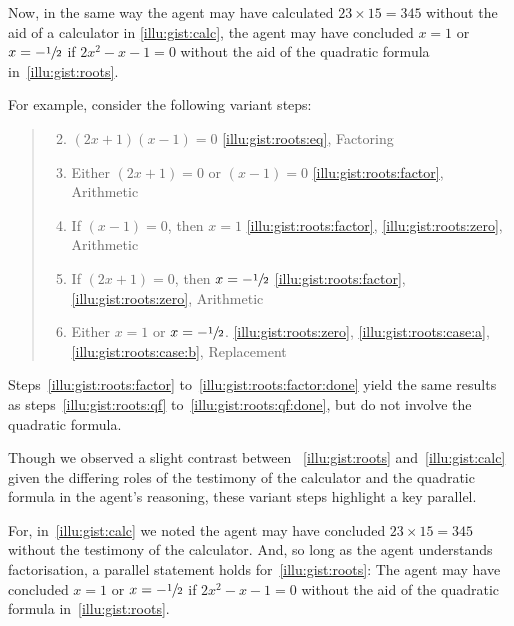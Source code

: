 \begin{note}
  Now, in the same way the agent may have calculated \(23 \times 15 = 345\) without the aid of a calculator in \autoref{illu:gist:calc}, the agent may have concluded \(x = 1\) or \(x = -\sfrac{1}{2}\) if \(2x^{2} - x - 1 = 0\) without the aid of the quadratic formula in~\autoref{illu:gist:roots}.

  For example, consider the following variant steps:
  \begin{quote}
    \begin{enumerate}[label=\arabic*\('\)., ref=(\arabic*\('\)), itemsep=.125em]
      \setcounter{enumi}{1}
    \item
      \label{illu:gist:roots:factor}
      \((2x + 1)(x - 1) = 0\) \hfill \ref{illu:gist:roots:eq}, Factoring
    \item
      \label{illu:gist:roots:zero}
      Either \((2x + 1) = 0\) or \((x - 1) = 0\) \hfill \ref{illu:gist:roots:factor}, Arithmetic
    \item
      \label{illu:gist:roots:case:a}
      If \((x - 1) = 0\), then \(x = 1\) \hfill \ref{illu:gist:roots:factor}, \ref{illu:gist:roots:zero}, Arithmetic
    \item
      \label{illu:gist:roots:case:b}
      If \((2x + 1) = 0\), then \(x = -\sfrac{1}{2}\) \hfill \ref{illu:gist:roots:factor}, \ref{illu:gist:roots:zero}, Arithmetic
    \item
      \label{illu:gist:roots:factor:done}
      Either \(x = 1\) or \(x = -\sfrac{1}{2}\). \hfill \ref{illu:gist:roots:zero}, \ref{illu:gist:roots:case:a}, \ref{illu:gist:roots:case:b}, Replacement
    \end{enumerate}
  \end{quote}

  Steps~\ref{illu:gist:roots:factor} to~\ref{illu:gist:roots:factor:done} yield the same results as steps~\ref{illu:gist:roots:qf} to~\ref{illu:gist:roots:qf:done}, but do not involve the quadratic formula.
\end{note}

\begin{note}
  Though we observed a slight contrast between ~\ref{illu:gist:roots} and~\ref{illu:gist:calc} given the differing roles of the testimony of the calculator and the quadratic formula in the agent's reasoning, these variant steps highlight a key parallel.

  For, in~\autoref{illu:gist:calc} we noted the agent may have concluded \(23 \times 15 = 345\) without the testimony of the calculator.
  And, so long as the agent understands factorisation, a parallel statement holds for~\ref{illu:gist:roots}:
  The agent may have concluded \(x = 1\) or \(x = -\sfrac{1}{2}\) if \(2x^{2} - x - 1 = 0\) without the aid of the quadratic formula in~\autoref{illu:gist:roots}.
\end{note}

